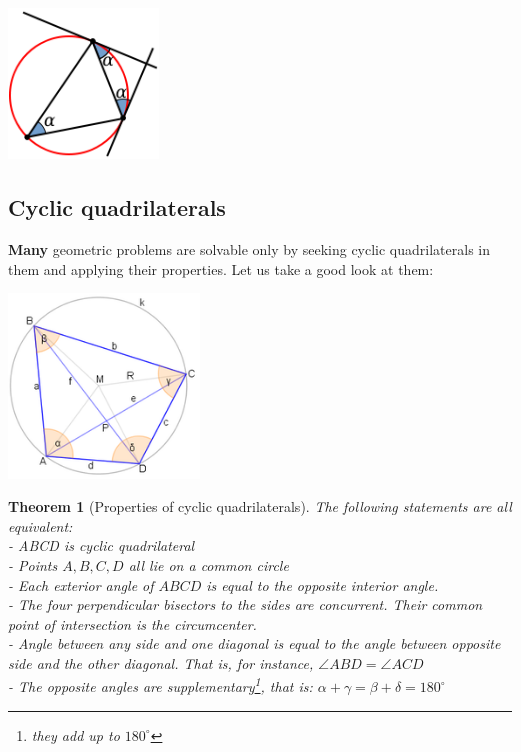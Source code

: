 \documentclass[11pt,a5paper]{article}
\newtheorem*{Theorem}{Theorem}
\begin{document}
\begin{center}
\includegraphics[width=0.3\textwidth]{circum}
\end{center}

\subsection*{Cyclic quadrilaterals}
\textbf{Many} geometric problems are solvable only by seeking cyclic quadrilaterals in them and applying their properties. Let us take a good look at them:
\begin{center}
\includegraphics[width=0.38\textwidth]{cyclic}
\end{center}

\begin{Theorem}[Properties of cyclic quadrilaterals]
The following statements are all equivalent:\\
- ABCD is cyclic quadrilateral\\
- Points $A,B,C,D$ all lie on a common circle \\
- Each exterior angle of $ABCD$ is equal to the opposite interior angle.\\
- The four perpendicular bisectors to the sides are concurrent. Their common point of intersection is the circumcenter. \\
- Angle between any side and one diagonal is equal to the angle between opposite side and the other diagonal. That is, for instance,  $\angle ABD = \angle ACD$ \\
- The opposite angles are supplementary\footnote{they add up to $180^\circ$}, that is: $\alpha + \gamma = \beta + \delta = 180^\circ$\\
\end{Theorem}
\end{document}
